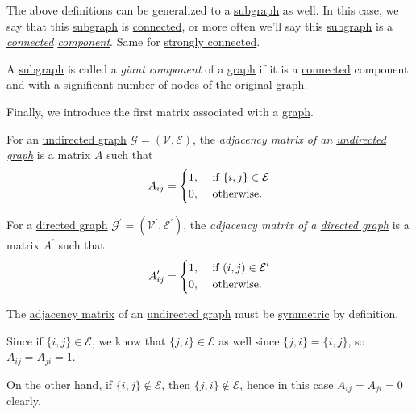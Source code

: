 \begin{notation}
	The above definitions can be generalized to a \hyperref[def:subgraph]{subgraph} as well. In this case, we say that this \hyperref[def:subgraph]{subgraph} is \hyperref[def:connected]{connected}, or more often we'll say this \hyperref[def:subgraph]{subgraph} is a \emph{\hyperref[def:connected]{connected} \hyperref[def:subgraph]{component}}. Same for \hyperref[def:strongly-connected]{strongly connected}.
\end{notation}

\begin{definition}\label{def:giant-component}
	A \hyperref[def:subgraph]{subgraph} is called a \emph{giant component} of a \hyperref[def:graph]{graph} if it is a \hyperref[def:connected]{connected} component and with a significant number of nodes of the original \hyperref[def:graph]{graph}.
\end{definition}

Finally, we introduce the first matrix associated with a \hyperref[def:graph]{graph}.
\begin{definition}\label{def:adjacency-matrix}
	For an \hyperref[def:undirected-graph]{undirected graph} \(\mathcal{G} = (\mathcal{V} , \mathcal{E} )\), the \emph{adjacency matrix of an \hyperref[def:undirected-graph]{undirected graph}} is a matrix \(A\) such that
	\[
		A_{ij} =\begin{dcases}
			1, & \text{ if }\{i, j\}\in\mathcal{E} \\
			0, & \text{ otherwise.}
		\end{dcases}
	\]

	For a \hyperref[def:directed-graph]{directed graph} \(\mathcal{G}^\prime = (\mathcal{V}^\prime , \mathcal{E}^\prime )\), the \emph{adjacency matrix of a \hyperref[def:directed-graph]{directed graph}} is a matrix \(A^\prime\) such that
	\[
		A^\prime _{ij} = \begin{dcases}
			1, & \text{ if }(i, j)\in\mathcal{E}^\prime \\
			0, & \text{ otherwise.}
		\end{dcases}
	\]
\end{definition}

\begin{remark}
	The \hyperref[def:adjacency-matrix]{adjacency matrix} of an \hyperref[def:undirected-graph]{undirected graph} must be \hyperref[def:symmetric-matrix]{symmetric} by definition.
\end{remark}
\begin{explanation}
	Since if \(\{i, j\}\in \mathcal{E} \), we know that \(\{j, i\}\in \mathcal{E} \) as well since \(\{j, i\} = \{i, j\}\), so \(A_{ij} = A_{ji} = 1\).

	On the other hand, if \(\{i, j\}\notin \mathcal{E} \), then \(\{j, i\}\notin \mathcal{E} \), hence in this case \(A_{ij} = A_{ji} = 0\) clearly.
\end{explanation}